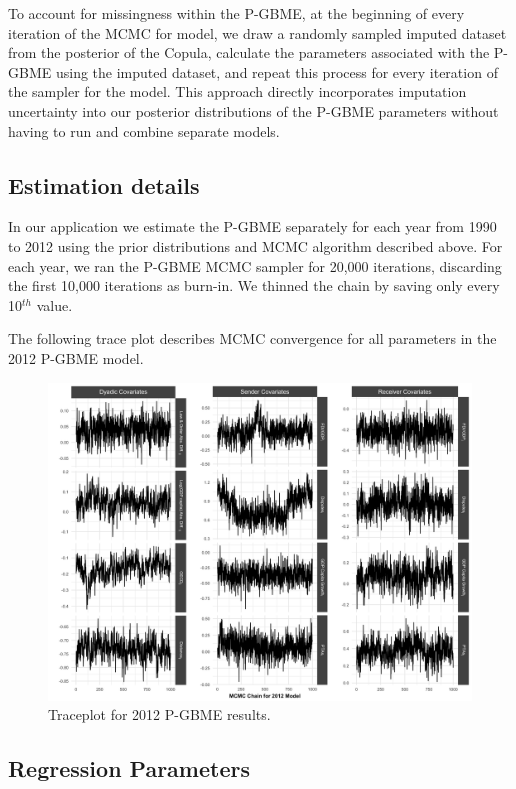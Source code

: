\documentclass[a4paper, 12pt]{article}
\begin{document}
To account for missingness within the P-GBME, at the beginning of every iteration of the MCMC for model, we draw a randomly sampled imputed dataset from the posterior of the Copula, calculate the parameters associated with the P-GBME using the imputed dataset, and repeat this process for every iteration of the sampler for the model. This approach directly incorporates imputation uncertainty into our posterior distributions of the P-GBME parameters without having to run and combine separate models. 

\subsection{Estimation details}

In our application we estimate the P-GBME separately for each year from 1990 to 2012 using the prior distributions and MCMC algorithm described above.  For each year, we ran the P-GBME MCMC sampler for 20,000 iterations, discarding the first 10,000 iterations as burn-in. We thinned the chain by saving only every 10$^{th}$ value. 

The following trace plot describes MCMC convergence for all parameters in the 2012 P-GBME model.  

\begin{figure}[ht]
\centering
\includegraphics[width=1\textwidth]{figureA2}
\caption{Traceplot for 2012 P-GBME results.}
\label{fig:trace}
\end{figure}
\FloatBarrier

\subsection{Regression Parameters}
\end{document}
